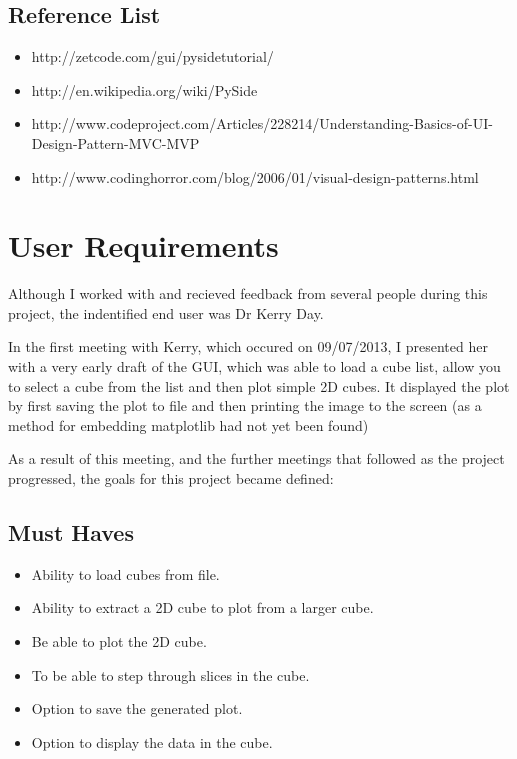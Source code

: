 \documentclass[whitecover]{MO_report}
\begin{document}
\section{Reference List}

\begin{itemize}

\item
http://zetcode.com/gui/pysidetutorial/

\item
http://en.wikipedia.org/wiki/PySide

\item
http://www.codeproject.com/Articles/228214/Understanding-Basics-of-UI-Design-Pattern-MVC-MVP

\item
http://www.codinghorror.com/blog/2006/01/visual-design-patterns.html

\end{itemize}

\pagebreak

\chapter{User Requirements}

Although I worked with and recieved feedback from several people during this
project, the indentified end user was Dr Kerry Day.

In the first meeting with Kerry, which occured on 09/07/2013, I presented her
with a very early draft of the GUI, which was able to load a cube list, allow
you to select a cube from the list and then plot simple 2D cubes. It displayed
the plot by first saving the plot to file and then printing the image to the
screen (as a method for embedding matplotlib had not yet been found)

As a result of this meeting, and the further meetings that followed as the
project progressed, the goals for this project became defined:

\vspace{4mm}

\section{Must Haves}

\begin{itemize}

\item
Ability to load cubes from file.

\item
Ability to extract a 2D cube to plot from a larger cube.

\item
Be able to plot the 2D cube.

\item
To be able to step through slices in the cube.

\item
Option to save the generated plot.

\item
Option to display the data in the cube.

\end{itemize}
\end{document}
